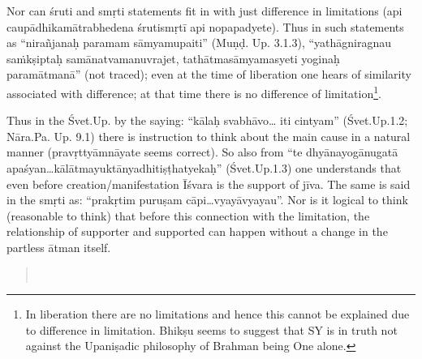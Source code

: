 Nor can śruti and smṛti statements fit in with just difference in limitations (api caupādhikamātrabhedena śrutismṛtī api nopapadyete). Thus in such statements as “nirañjanaḥ paramam sāmyamupaiti” (Muṇḍ. Up. 3.1.3), “yathāgniragnau saṁkṣiptaḥ samānatvamanuvrajet, tathātmasāmyamasyeti yoginaḥ paramātmanā” (not traced); even at the time of liberation one hears of similarity associated with difference; at that time there is no difference of limitation\footnote{In liberation there are no limitations and hence this cannot be explained due to difference in limitation. Bhikṣu seems to suggest that SY is in truth not against the Upaniṣadic philosophy of Brahman being One alone.}. 

Thus in the Śvet.Up. by the saying: “kālaḥ svabhāvo… iti cintyam” (Śvet.Up.1.2; Nāra.Pa. Up. 9.1) there is instruction to think about the main cause in a natural manner (pravṛttyāmnāyate seems correct). So also from “te dhyānayogānugatā apaśyan…kālātmayuktānyadhitiṣṭha\-tyekaḥ” (Śvet.Up.1.3) one understands that even before creation/\-manifestation Īśvara is the support of jīva. The same is said in the smṛti as: “prakṛtim puruṣam cāpi…vyayāvyayau”. Nor is it logical to think (reasonable to think) that before this connection with the limitation, the relationship of supporter and supported can happen without a change in the partless ātman itself. 
\begin{verse}
\\
\end{verse}




